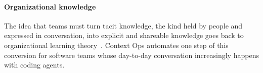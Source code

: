 \paragraph{Organizational knowledge} The idea that teams must turn tacit knowledge, the kind held by people and expressed in conversation, into explicit and shareable knowledge goes back to organizational learning theory~\cite{nonaka1995}. Context Ops automates one step of this conversion for software teams whose day-to-day conversation increasingly happens with coding agents.
